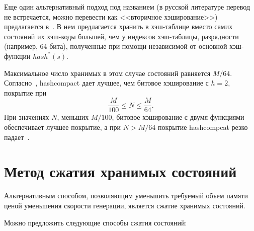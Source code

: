 Еще один альтернативный подход под названием  (в русской литературе
перевод не встречается, можно перевести как <<вторичное хэширование>>) предлагается
в~\cite{Wolper}. В нем предлагается хранить в хэш-таблице вместо самих состояний их
хэш-коды большей, чем у индексов хэш-таблицы, разрядности (например, 64 бита), полученные
при помощи независимой от основной хэш-функции $hash^*(s)$.

Максимальное число хранимых в этом случае состояний равняется
$M/64$. Согласно~\cite{BitHash1}, hashcompact дает лучшее, чем битовое хэширование с $h =
2$, покрытие при
\begin{equation}
  \label{eq:hashcompcat-coverage-optima}
  \frac{M}{100} \leq N \leq \frac{M}{64}.
\end{equation}
При значениях $N$, меньших $M/100$, битовое хэширование с двумя функциями обеспечивает
лучшее покрытие, а при $N > M/64$ покрытие hashcompcat резко падает~\cite{Wolper}.


\section{Метод сжатия хранимых состояний}
\label{sec:state-compression}


Альтернативным способом, позволяющим уменьшить требуемый объем памяти ценой уменьшения
скорости генерации, является сжатие хранимых состояний.

Можно предложить следующие способы сжатия состояний:

